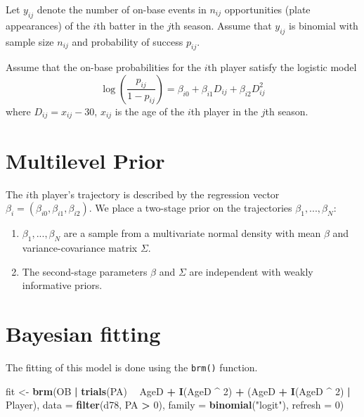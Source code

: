 \documentclass[
]{book}
\newenvironment{Shaded}{\begin{snugshade}}{\end{snugshade}}
\newcommand{\DataTypeTok}[1]{\textcolor[rgb]{0.13,0.29,0.53}{#1}}
\newcommand{\DecValTok}[1]{\textcolor[rgb]{0.00,0.00,0.81}{#1}}
\newcommand{\KeywordTok}[1]{\textcolor[rgb]{0.13,0.29,0.53}{\textbf{#1}}}
\newcommand{\NormalTok}[1]{#1}
\newcommand{\OperatorTok}[1]{\textcolor[rgb]{0.81,0.36,0.00}{\textbf{#1}}}
\newcommand{\StringTok}[1]{\textcolor[rgb]{0.31,0.60,0.02}{#1}}
\begin{document}
Let \(y_{ij}\) denote the number of on-base events in \(n_{ij}\) opportunities (plate appearances) of the \(i\)th batter in the \(j\)th season. Assume that \(y_{ij}\) is binomial with sample size \(n_{ij}\) and probability of success \(p_{ij}\).

Assume that the on-base probabilities for the \(i\)th player satisfy the logistic model
\[
\log \left(\frac{p_{ij}}{1 - p_{ij}}\right) = \beta_{i0} + \beta_{i1} D_{ij} + \beta_{i2} D_{ij}^2
\]
where \(D_{ij} = x_{ij} - 30\), \(x_{ij}\) is the age of the \(i\)th player in the \(j\)th season.

\hypertarget{multilevel-prior}{%
\section{Multilevel Prior}\label{multilevel-prior}}

The \(i\)th player's trajectory is described by the regression vector \(\beta_i = (\beta_{i0}, \beta_{i1}, \beta_{i2})\). We place a two-stage prior on the trajectories \(\beta_1, ..., \beta_N\):

\begin{enumerate}
\def\labelenumi{\arabic{enumi}.}
\item
  \(\beta_1, ..., \beta_N\) are a sample from a multivariate normal density with mean \(\beta\) and variance-covariance matrix \(\Sigma\).
\item
  The second-stage parameters \(\beta\) and \(\Sigma\) are independent with weakly informative priors.
\end{enumerate}

\hypertarget{bayesian-fitting}{%
\section{Bayesian fitting}\label{bayesian-fitting}}

The fitting of this model is done using the \texttt{brm()} function.

\begin{Shaded}
\begin{Highlighting}[]
\NormalTok{fit <-}\StringTok{ }\KeywordTok{brm}\NormalTok{(OB }\OperatorTok{|}\StringTok{ }\KeywordTok{trials}\NormalTok{(PA) }\OperatorTok{~}\StringTok{ }\NormalTok{AgeD }\OperatorTok{+}\StringTok{ }\KeywordTok{I}\NormalTok{(AgeD }\OperatorTok{^}\StringTok{ }\DecValTok{2}\NormalTok{) }\OperatorTok{+}
\StringTok{             }\NormalTok{(AgeD }\OperatorTok{+}\StringTok{ }\KeywordTok{I}\NormalTok{(AgeD }\OperatorTok{^}\StringTok{  }\DecValTok{2}\NormalTok{) }\OperatorTok{|}\StringTok{ }\NormalTok{Player),}
           \DataTypeTok{data =} \KeywordTok{filter}\NormalTok{(d78, PA }\OperatorTok{>}\StringTok{ }\DecValTok{0}\NormalTok{),}
           \DataTypeTok{family =} \KeywordTok{binomial}\NormalTok{(}\StringTok{"logit"}\NormalTok{),}
           \DataTypeTok{refresh =} \DecValTok{0}\NormalTok{)}
\end{Highlighting}
\end{Shaded}
\end{document}
